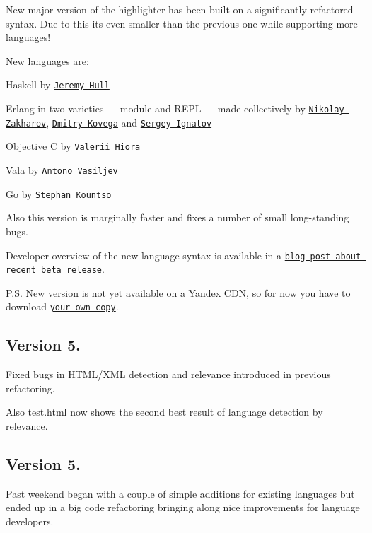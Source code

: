 New major version of the highlighter has been built on a significantly refactored syntax. Due to this it\textquotesingle{}s even smaller than the previous one while supporting more languages!

New languages are\+:


\begin{DoxyItemize}
\item Haskell by \href{https://github.com/sourrust}{\tt Jeremy Hull}
\item Erlang in two varieties — module and R\+E\+PL — made collectively by \href{http://desh.su/}{\tt Nikolay Zakharov}, \href{https://github.com/arhibot}{\tt Dmitry Kovega} and \href{https://github.com/ignatov}{\tt Sergey Ignatov}
\item Objective C by \href{https://github.com/vhbit}{\tt Valerii Hiora}
\item Vala by \href{https://github.com/antono}{\tt Antono Vasiljev}
\item Go by \href{https://github.com/steplg}{\tt Stephan Kountso}
\end{DoxyItemize}

Also this version is marginally faster and fixes a number of small long-\/standing bugs.

Developer overview of the new language syntax is available in a \href{http://softwaremaniacs.org/blog/2011/04/25/highlight-js-60-beta/en/}{\tt blog post about recent beta release}.

P.\+S. New version is not yet available on a Yandex\textquotesingle{} C\+DN, so for now you have to download \href{/soft/highlight/en/download/}{\tt your own copy}.

\subsection*{Version 5.}

Fixed bugs in H\+T\+M\+L/\+X\+ML detection and relevance introduced in previous refactoring.

Also test.\+html now shows the second best result of language detection by relevance.

\subsection*{Version 5.}

Past weekend began with a couple of simple additions for existing languages but ended up in a big code refactoring bringing along nice improvements for language developers.

